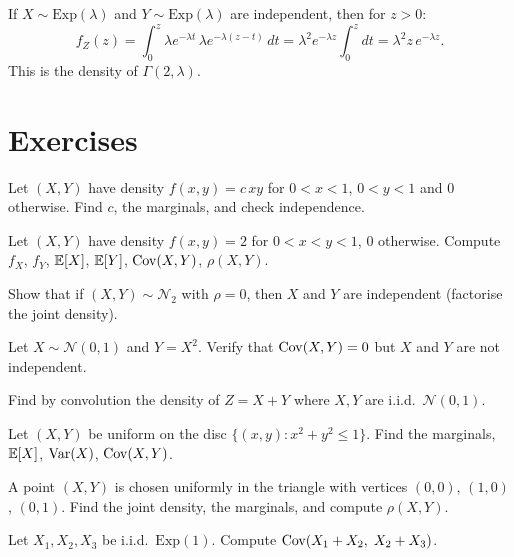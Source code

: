 \begin{example}
If $X \sim \mathrm{Exp}(\lambda)$ and $Y \sim \mathrm{Exp}(\lambda)$ are independent,
then for $z > 0$:
\[
    f_Z(z) = \int_0^z \lambda e^{-\lambda t}\,\lambda e^{-\lambda(z-t)}\,dt
    = \lambda^2 e^{-\lambda z}\int_0^z dt = \lambda^2 z\,e^{-\lambda z}.
\]
This is the density of $\Gamma(2, \lambda)$.
\end{example}

\section{Exercises}

\begin{exercise}
Let $(X,Y)$ have density $f(x,y) = c\,xy$ for $0 < x < 1$, $0 < y < 1$
and $0$ otherwise. Find $c$, the marginals, and check independence.
\end{exercise}

\begin{exercise}
Let $(X,Y)$ have density $f(x,y) = 2$ for $0 < x < y < 1$, $0$ otherwise.
Compute $f_X$, $f_Y$, $\mathbb{E}[X]$, $\mathbb{E}[Y]$, $\mathrm{Cov}(X,Y)$, $\rho(X,Y)$.
\end{exercise}

\begin{exercise}
Show that if $(X,Y) \sim \mathcal{N}_2$ with $\rho = 0$, then $X$ and $Y$
are independent (factorise the joint density).
\end{exercise}

\begin{exercise}
Let $X \sim \mathcal{N}(0,1)$ and $Y = X^2$. Verify that $\mathrm{Cov}(X,Y) = 0$
but $X$ and $Y$ are not independent.
\end{exercise}

\begin{exercise}
Find by convolution the density of $Z = X + Y$ where $X, Y$ are i.i.d.\
$\mathcal{N}(0,1)$.
\end{exercise}

\begin{exercise}
Let $(X,Y)$ be uniform on the disc $\{(x,y) : x^2+y^2 \leq 1\}$.
Find the marginals, $\mathbb{E}[X]$, $\mathrm{Var}(X)$, $\mathrm{Cov}(X,Y)$.
\end{exercise}

\begin{exercise}
A point $(X,Y)$ is chosen uniformly in the triangle with vertices
$(0,0)$, $(1,0)$, $(0,1)$. Find the joint density, the marginals,
and compute $\rho(X,Y)$.
\end{exercise}

\begin{exercise}
Let $X_1, X_2, X_3$ be i.i.d.\ $\mathrm{Exp}(1)$. Compute
$\mathrm{Cov}(X_1+X_2,\; X_2+X_3)$.
\end{exercise}

